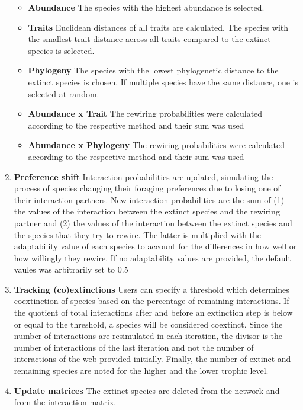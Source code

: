 \documentclass[12pt,a4paper]{article}
\begin{document}
\begin{enumerate}
		\begin{itemize}
		\item \label{itm:abund_rew} \textbf{Abundance} {\small The species with the highest abundance is selected.}
		\item \label{itm:trait_rew} \textbf{Traits} {\small Euclidean distances of all traits are calculated. The species with the smallest trait distance across all traits compared to the extinct species is selected.}
		\item \label{itm:phylo_rew} \textbf{Phylogeny} {\small The species with the lowest phylogenetic distance to the extinct species is chosen. If multiple species have the same distance, one is selected at random.}
		\item \label{itm:AT_rew} \textbf{Abundance x Trait} {\small The rewiring probabilities were calculated according to the respective method and their sum was used}
		\item \label{itm:AP_rew} \textbf{Abundance x Phylogeny} {\small The rewiring probabilities were calculated according to the respective method and their sum was used}
		\end{itemize}
	\item \label{itm:shift} \textbf{Preference shift} {\small Interaction probabilities are updated, simulating the process of species changing their foraging preferences due to losing one of their interaction partners. New interaction probabilities are the sum of (1) the values of the interaction between the extinct species and the rewiring partner and (2) the values of the interaction between the extinct species and the species that they try to rewire. The latter is multiplied with the adaptability value of each species to account for the differences in how well or how willingly they rewire. If no adaptability values are provided, the default vaules was arbitrarily set to 0.5}
	\item  \label{itm:track} \textbf{Tracking (co)extinctions} {\small Users can specify a threshold which determines coextinction of species based on the percentage of remaining interactions. If the quotient of total interactions after and before an extinction step is below or equal to the threshold, a species will be considered coextinct. Since the number of interactions are resimulated in each iteration, the divisor is the number of interactions of the last iteration and not the number of interactions of the web provided initially. Finally, the number of extinct and remaining species are noted for the higher and the lower trophic level.}
	\item \label{itm:update} \textbf{Update matrices} {\small The extinct species are deleted from the network and from the interaction matrix.}

\end{enumerate}
\end{document}
